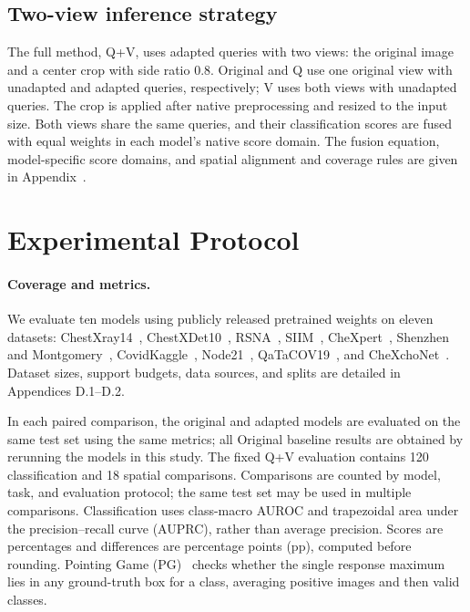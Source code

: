 \documentclass[10pt,twocolumn,letterpaper]{article}
\begin{document}
\subsection{Two-view inference strategy}
\label{sec:views}
The full method, Q+V, uses adapted queries with two views: the original image and a center crop with side ratio 0.8. Original and Q use one original view with unadapted and adapted queries, respectively; V uses both views with unadapted queries. The crop is applied after native preprocessing and resized to the input size. Both views share the same queries, and their classification scores are fused with equal weights in each model's native score domain. The fusion equation, model-specific score domains, and spatial alignment and coverage rules are given in Appendix~.

\section{Experimental Protocol}
\label{sec:protocol}
\paragraph{Coverage and metrics.}
We evaluate ten models using publicly released pretrained weights on eleven datasets: ChestXray14~\cite{wang2017chestxray8}, ChestXDet10~\cite{liu2020chestxdet10}, RSNA~\cite{shih2019rsna}, SIIM~\cite{filice2020siim}, CheXpert~\cite{irvin2019chexpert}, Shenzhen and Montgomery~\cite{jaeger2014tuberculosisdatasets}, CovidKaggle~\cite{chowdhury2020covidradiography,rahman2021covidradiography}, Node21~\cite{sogancioglu2024node21}, QaTaCOV19~\cite{degerli2022qatacov19}, and CheXchoNet~\cite{elias2024chexchonet}. Dataset sizes, support budgets, data sources, and splits are detailed in Appendices D.1--D.2.

In each paired comparison, the original and adapted models are evaluated on the same test set using the same metrics; all Original baseline results are obtained by rerunning the models in this study. The fixed Q+V evaluation contains 120 classification and 18 spatial comparisons. Comparisons are counted by model, task, and evaluation protocol; the same test set may be used in multiple comparisons. Classification uses class-macro AUROC and trapezoidal area under the precision--recall curve (AUPRC), rather than average precision. Scores are percentages and differences are percentage points (pp), computed before rounding. Pointing Game (PG)~\cite{zhang2016pointinggame} checks whether the single response maximum lies in any ground-truth box for a class, averaging positive images and then valid classes.
\end{document}
